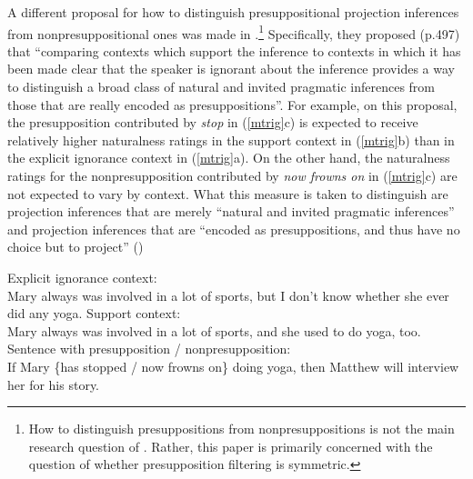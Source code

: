 \documentclass[11pt,fleqn]{article}
\newcommand{\6}{\mbox{$[\hspace*{-.6mm}[$}}
\newcommand{\9}{\mbox{$]\hspace*{-.6mm}]$}}
\begin{document}
A different proposal for how to distinguish presuppositional projection inferences from nonpresuppositional ones was made in \citealt{mandelkern-etal2020}.\footnote{How to distinguish presuppositions from nonpresuppositions is not the main research question of \citealt{mandelkern-etal2020}. Rather, this paper is primarily concerned with the question of whether presupposition filtering is symmetric.} Specifically, they proposed (p.497) that ``comparing contexts which support the inference to contexts in which it has been made clear that the speaker is ignorant about the inference provides a way to distinguish a broad class of natural and invited pragmatic inferences from those that are really encoded as presuppositions''. For example, on this proposal, the presupposition contributed by \emph{stop} in (\ref{mtrig}c) is expected to receive relatively higher naturalness ratings in the support context in (\ref{mtrig}b) than in the explicit ignorance context in (\ref{mtrig}a). On the other hand, the naturalness ratings for the nonpresupposition contributed by \emph{now frowns on} in (\ref{mtrig}c) are not expected to vary by context. What this measure is taken to distinguish are projection inferences that are merely ``natural and invited pragmatic inferences'' and projection inferences that are ``encoded as presuppositions, and thus have no choice but to project'' (\citealt[497]{mandelkern-etal2020})

\begin{exe}
\ex\label{mtrig} \citealt[490f.]{mandelkern-etal2020}
\begin{xlist}
\ex Explicit ignorance context: \\ Mary always was involved in a lot of sports, but I don't know whether she ever did any yoga.
\ex Support context: \\ Mary always was involved in a lot of sports, and she used to do yoga, too.
\ex Sentence with presupposition / nonpresupposition: \\ If Mary \{has stopped / now frowns on\} doing yoga, then Matthew will interview her for his story.
\end{xlist}
\end{exe}
\end{document}
